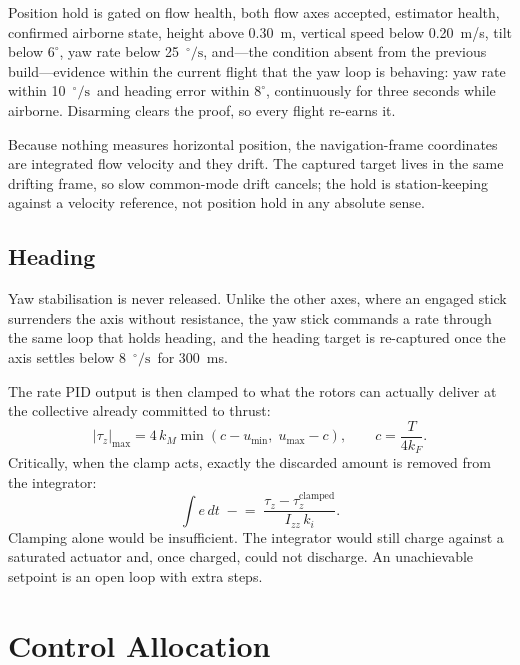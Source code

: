 \documentclass[conference]{IEEEtran}
\newcommand{\kF}{k_{F}}
\newcommand{\kM}{k_{M}}
\newcommand{\dps}{\ensuremath{^{\circ}\!/\mathrm{s}}}
\begin{document}
Position hold is gated on flow health, both flow axes accepted, estimator
health, confirmed airborne state, height above 0.30~m, vertical speed below
0.20~m/s, tilt below $6^{\circ}$, yaw rate below 25~\dps, and---the condition
absent from the previous build---evidence within the current flight that the
yaw loop is behaving: yaw rate within 10~\dps\ and heading error within
$8^{\circ}$, continuously for three seconds while airborne. Disarming clears
the proof, so every flight re-earns it.

Because nothing measures horizontal position, the navigation-frame coordinates
are integrated flow velocity and they drift. The captured target lives in the
same drifting frame, so slow common-mode drift cancels; the hold is
station-keeping against a velocity reference, not position hold in any
absolute sense.

\subsection{Heading}

Yaw stabilisation is never released. Unlike the other axes, where an engaged
stick surrenders the axis without resistance, the yaw stick commands a rate
through the same loop that holds heading, and the heading target is
re-captured once the axis settles below 8~\dps\ for 300~ms.

The rate PID output is then clamped to what the rotors can actually deliver at
the collective already committed to thrust:
\begin{equation}
\left|\tau_z\right|_{\max} = 4\,\kM \min\!\left(c - u_{\min},\; u_{\max} - c\right),
\qquad c = \frac{T}{4\kF}.
\label{eq:yawauth}
\end{equation}
Critically, when the clamp acts, exactly the discarded amount is removed from
the integrator:
\begin{equation}
\int e\,dt \;\mathrel{-}=\; \frac{\tau_z - \tau_z^{\text{clamped}}}{I_{zz}\,k_i}.
\end{equation}
Clamping alone would be insufficient. The integrator would still charge
against a saturated actuator and, once charged, could not discharge. An
unachievable setpoint is an open loop with extra steps.

\section{Control Allocation}
\label{sec:alloc}
\end{document}
